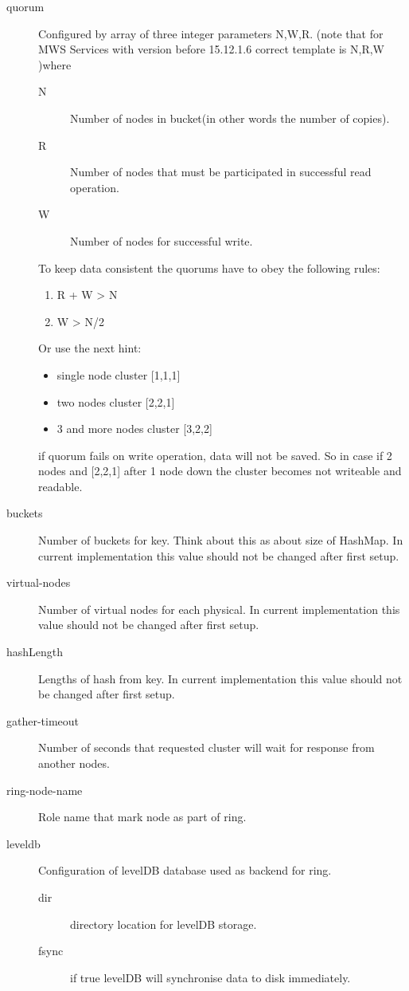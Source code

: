 \begin{description}
  \item[quorum] Configured by array of three integer parameters N,W,R. (note that for MWS Services with version before 15.12.1.6 correct template is N,R,W )where
  \begin{description}
    \item[N] Number of nodes in bucket(in other words the number of copies).
    \item[R] Number of nodes that must  be participated in successful read operation.
    \item[W] Number of nodes for successful write.
  \end{description}
  To keep data consistent the quorums have to obey the following rules:
  \begin{enumerate}
    \item R + W > N
    \item W > N/2
  \end{enumerate}
  Or use the next hint:
  \begin{itemize}
    \item single node cluster [1,1,1]
    \item two nodes cluster [2,2,1]
    \item 3 and more nodes cluster [3,2,2]
  \end{itemize}
  if quorum fails on write operation, data will not be saved. So in case if 2 nodes and [2,2,1] after 1 node down the cluster becomes not writeable and readable.
  \item[buckets] Number of buckets for key. Think about this as about size of HashMap. In current implementation this value should not be changed after first setup.
  \item[virtual-nodes] Number of virtual nodes for each physical. In current implementation this value should not be changed after first setup.
  \item[hashLength] Lengths of hash from key. In current implementation this value should not be changed after first setup.
  \item[gather-timeout] Number of seconds that requested cluster will wait for response from another nodes.
  \item[ring-node-name] Role name that mark node as part of ring.
  \item[leveldb] Configuration of levelDB database used as backend for ring.
  \begin{description}
    \item[dir] directory location for levelDB storage.
    \item[fsync] if true levelDB will synchronise data to disk immediately.
  \end{description}
\end{description}

